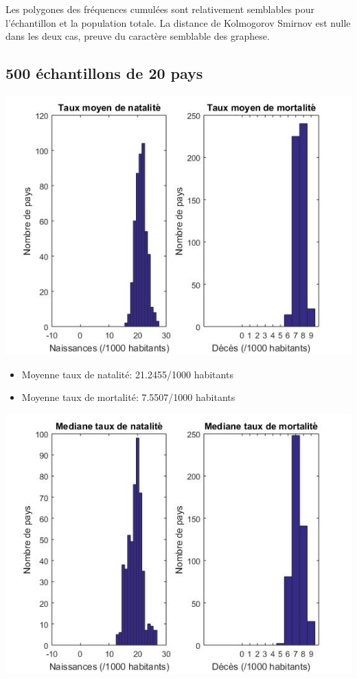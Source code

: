 \documentclass[a4paper,10pt]{article}
\begin{document}
Les polygones des fréquences cumulées sont relativement semblables pour l'échantillon et la population totale. La distance de Kolmogorov Smirnov est nulle dans les deux cas, preuve du caractère semblable des graphese.


\subsection{500 échantillons de 20 pays}

\begin{center}
	\includegraphics[scale=0.8]{Figure9.jpg}
\end{center}

\begin{itemize}
	\item Moyenne taux de natalité: 21.2455/1000 habitants
	\item Moyenne taux de mortalité: 7.5507/1000 habitants
\end{itemize}

\begin{center}
	\includegraphics[scale=0.8]{Figure10.jpg}
\end{center}
\end{document}
